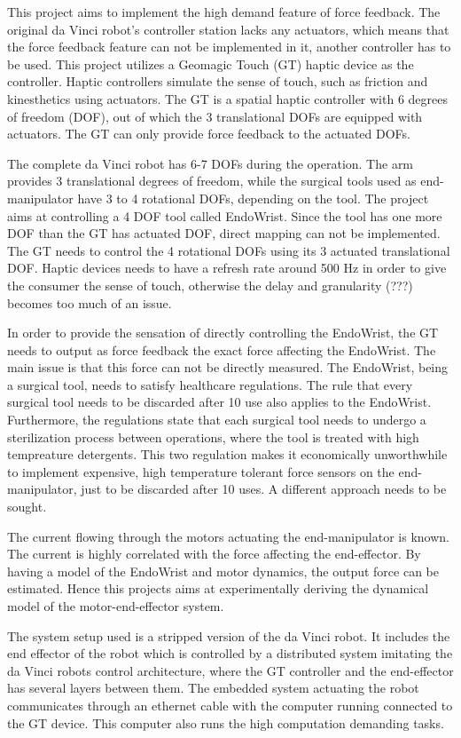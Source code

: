 This project aims to implement the high demand feature of force feedback. The original da Vinci robot's controller station lacks any actuators, which means that the force feedback feature can not be implemented in it, another controller has to be used. This project utilizes a Geomagic Touch (GT) haptic device as the controller. Haptic controllers simulate the sense of touch, such as friction and kinesthetics using actuators.
The GT is a spatial haptic controller with 6 degrees of freedom (DOF), out of which the 3 translational DOFs are equipped with actuators. The GT can only provide force feedback to the actuated DOFs.

The complete da Vinci robot has 6-7 DOFs during the operation. The arm provides 3 translational degrees of freedom, while the surgical tools used as end-manipulator have 3 to 4 rotational DOFs, depending on the tool. The project aims at controlling a 4 DOF tool called EndoWrist. Since the tool has one more DOF than the GT has actuated DOF, direct mapping can not be implemented. The GT needs to control the 4 rotational DOFs using its 3 actuated translational DOF. Haptic devices needs to have a refresh rate around 500 Hz in order to give the consumer the sense of touch, otherwise the delay and granularity (???) becomes too much of an issue.

In order to provide the sensation of directly controlling the EndoWrist, the GT needs to output as force feedback the exact force affecting the EndoWrist. The main issue is that this force can not be directly measured. The EndoWrist, being a surgical tool, needs to satisfy healthcare regulations. The rule that every surgical tool needs to be discarded after 10 use also applies to the EndoWrist. Furthermore, the regulations state that each surgical tool needs to undergo a sterilization process between operations, where the tool is treated with high tempreature detergents. This two regulation makes it economically unworthwhile to implement expensive, high temperature tolerant force sensors on the end-manipulator, just to be discarded after 10 uses. A different approach needs to be sought.

The current flowing through the motors actuating the end-manipulator is known. The current is highly correlated with the force affecting the end-effector. By having a model of the EndoWrist and motor dynamics, the output force can be estimated. Hence this projects aims at experimentally deriving the dynamical model of the motor-end-effector system.

The system setup used is a stripped version of the da Vinci robot. It includes the end effector of the robot which is controlled by a distributed system imitating the da Vinci robots control architecture, where the GT controller and the end-effector has several layers between them. The embedded system actuating the robot communicates through an ethernet cable with the computer running connected to the GT device. This computer also runs the high computation demanding tasks.

